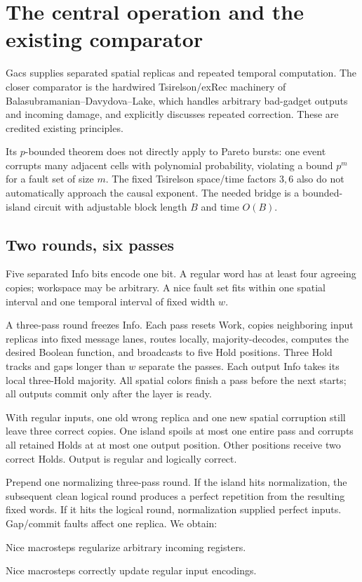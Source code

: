 \documentclass[11pt,a4paper]{article}
\begin{document}
\section{The central operation and the existing comparator}
Gacs supplies separated spatial replicas and repeated temporal computation.\cite{gacs} The closer comparator is the hardwired Tsirelson/exRec machinery of Balasubramanian--Davydova--Lake, which handles arbitrary bad-gadget outputs and incoming damage, and explicitly discusses repeated correction.\cite{bdlake} These are credited existing principles.

Its $p$-bounded theorem does not directly apply to Pareto bursts: one event corrupts many adjacent cells with polynomial probability, violating a bound $p^m$ for a fault set of size $m$. The fixed Tsirelson space/time factors $3,6$ also do not automatically approach the causal exponent. The needed bridge is a bounded-island circuit with adjustable block length $B$ and time $O(B)$.

\subsection{Two rounds, six passes}
Five separated Info bits encode one bit. A regular word has at least four agreeing copies; workspace may be arbitrary. A nice fault set fits within one spatial interval and one temporal interval of fixed width $w$.

A three-pass round freezes Info. Each pass resets Work, copies neighboring input replicas into fixed message lanes, routes locally, majority-decodes, computes the desired Boolean function, and broadcasts to five Hold positions. Three Hold tracks and gaps longer than $w$ separate the passes. Each output Info takes its local three-Hold majority. All spatial colors finish a pass before the next starts; all outputs commit only after the layer is ready.

With regular inputs, one old wrong replica and one new spatial corruption still leave three correct copies. One island spoils at most one entire pass and corrupts all retained Holds at at most one output position. Other positions receive two correct Holds. Output is regular and logically correct.

Prepend one normalizing three-pass round. If the island hits normalization, the subsequent clean logical round produces a perfect repetition from the resulting fixed words. If it hits the logical round, normalization supplied perfect inputs. Gap/commit faults affect one replica. We obtain:
\begin{description}[leftmargin=1.5em]
\item[R.] Nice macrosteps regularize arbitrary incoming registers.
\item[C.] Nice macrosteps correctly update regular input encodings.
\end{description}
\end{document}
